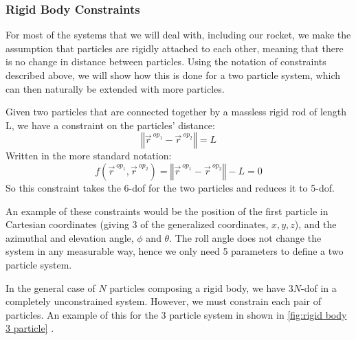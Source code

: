 \documentclass[10pt, openany, titlepage]{book}
\theoremstyle{definition}
\newcounter{example}[chapter]
\let\oldautoref\autoref
\renewcommand{\autoref}[1]{%
  \begingroup
  \hypersetup{linkcolor=black}%
  \oldautoref{#1}%
  \endgroup
}
\begin{document}
\subsubsection{Rigid Body Constraints}\label{sec: rigid body constraints}
For most of the systems that we will deal with, including our rocket, we make the assumption that particles are rigidly attached to each other, meaning that there is no change in distance between particles. Using the notation of constraints described above, we will show how this is done for a two particle system, which can then naturally be extended with more particles.

Given two particles that are connected together by a massless rigid rod of length L, we have a constraint on the particles' distance:
$$\left\Vert \vec{r}^{\ op_1}-\vec{r}^{\ op_2}\right\Vert=L$$
Written in the more standard notation:
$$f\left(\vec{r}^{\ op_1},\vec{r}^{\ op_2}\right)=\left\Vert \vec{r}^{\ op_1}-\vec{r}^{\ op_2}\right\Vert-L=0$$
So this constraint takes the 6-\gls{dof} for the two particles and reduces it to 5-\gls{dof}.

An example of these constraints would be the position of the first particle in Cartesian coordinates (giving 3 of the \glspl{generalized coordinate}, $x,y,z$), and the azimuthal and elevation angle, $\phi$ and $\theta$. The roll angle does not change the system in any measurable way, hence we only need 5 parameters to define a two particle system.

In the general case of $N$ particles composing a \gls{rigid body}, we have $3N$-\gls{dof} in a completely unconstrained system. However, we must constrain each pair of particles. An example of this for the 3 particle system in shown in \autoref{fig:rigid body 3 particle}.
\end{document}
